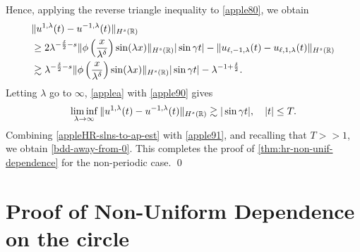 %
%
Hence, applying the reverse triangle inequality to \eqref{apple80}, we 
obtain
%
%
\begin{equation} \label{apple90}
\begin{split}
& \|
u^{1,\lambda}(t)
-
u^{- 1,\lambda}(t)
\|_{H^s(\mathbb{R})}
\\
& \ge 2 \lambda^{-\frac{\delta}{2}-s} \|\phi\left(
\frac{x}{\lambda^\delta} \right) \sin(\lambda x) \|_{H^s(\mathbb{R})} |\sin \gamma 
t|
- \|u_{\ell,-1,\lambda}(t) - u_{\ell,1,\lambda}(t)\|_{H^s(\mathbb{R})} \\
& \gtrsim \lambda^{-\frac{\delta}{2}-s} \|\phi\left(
\frac{x}{\lambda^\delta} \right ) \sin(\lambda x) \|_{H^s(\mathbb{R})} |\sin 
\gamma t| -
\lambda^{-1 + \frac{\delta}{2}}.
\end{split}
\end{equation}
%
%
%
%
Letting $\lambda$ go to $\infty$,  \cref{applea}
with \eqref{apple90}  gives
%
%
%
%
\begin{equation} \label{apple91}
\liminf_{\lambda \to\infty}
\|
u^{1,\lambda}(t)
-
u^{- 1,\lambda}(t)
\|_{H^s(\mathbb{R})}
\gtrsim
|\sin \gamma t|, \quad |t| \le T.
\end{equation}
%
%
Combining \eqref{appleHR-slns-to-ap-est} with \eqref{apple91}, and 
recalling that $T >>1$, we obtain \eqref{bdd-away-from-0}. This completes 
the proof of \cref{thm:hr-non-unif-dependence} for the
non-periodic case. \qed
%
%
%
%
%
%
%
%
\section{Proof of Non-Uniform Dependence 
on the circle}
\label{sec:3}

